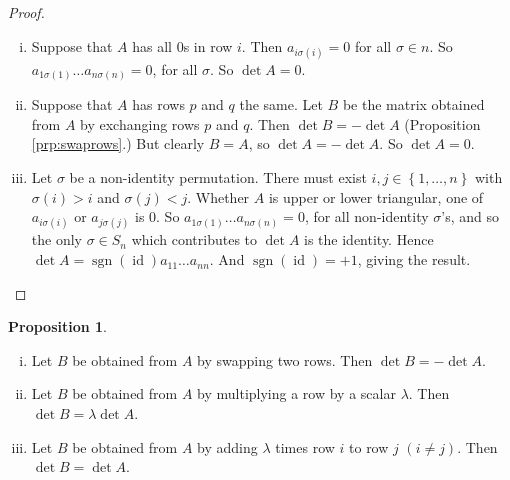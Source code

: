 \documentclass{article}
\theoremstyle{definition} \newtheorem*{definition}{Definition}
\newtheorem{proposition}[theorem]{Proposition}
\DeclareMathOperator{\sgn}{sgn} \DeclareMathOperator{\id}{id}
\begin{document}
    \begin{proof}\hfill \begin{enumerate}[(i)] \item  Suppose that $A$ has all
            0s in row $i$. Then $a_{i\sigma(i)} = 0$ for all $\sigma \in n$.
          So $a_{1\sigma(1)}\dots a_{n\sigma(n)} = 0$, for all $\sigma$. So
        $\det A = 0$.  \item  Suppose that $A$ has rows $p$ and $q$ the same.
          Let $B$ be the matrix obtained from $A$ by exchanging rows $p$ and
          $q$. Then $\det B = -\det A $ (Proposition \ref{prp:swaprows}.) But
          clearly $B = A$, so $\det A = -\det A$. So $\det A = 0$.

     \item Let $\sigma$  be a non-identity permutation. There must exist $i, j
       \in \left\{ 1,\dots ,n \right\}$ with $\sigma(i) > i$ and $\sigma(j) <
       j$. Whether $A$ is upper or lower triangular, one of $a_{i\sigma(i)}$ or
       $a_{j\sigma(j)}$ is 0. So $a_{1\sigma(1)}\dots a_{n\sigma(n)} = 0$, for
       all non-identity $\sigma$’s, and so the only $\sigma \in S_n$ which
       contributes to $\det A$ is the identity. Hence $\det A = \sgn(\id)
       a_{11}\dots a_{nn}$. And $\sgn(\id) = +1$, giving the result.
   \end{enumerate} \end{proof}

\begin{proposition}\hfill \label{prp:rowops} \begin{enumerate}[(i)] \item Let $B$ be
        obtained from $A$ by swapping two rows. Then $\det B = - \det A$.
      \item Let $B$ be obtained from $A$ by multiplying a row by a scalar
        $\lambda$. Then $\det B = \lambda\det A$.  \item Let $B$ be obtained
          from $A$ by adding $\lambda$ times row $i$ to row $j$ $(i \neq j)$.
          Then $\det B = \det A$.  \end{enumerate} \end{proposition}
\end{document}
